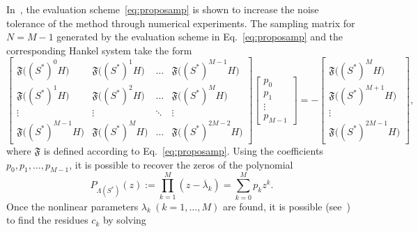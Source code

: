 \documentclass{arxiv}
\newcommand{\funF}{\mathfrak{F}}
\begin{document}
In~\cite{dozsa2025system}, the evaluation scheme~\eqref{eq:proposamp} is shown to increase the noise tolerance of the method through numerical experiments. 
The sampling matrix for $N = M-1$ generated by the evaluation scheme in Eq.~\eqref{eq:proposamp} and the corresponding Hankel system take the form
\begin{equation}\label{eq:hankRat}
    \begin{bmatrix}
         \funF\big(( S^{\ast})^{0} H\big) & \funF\big(( S^{\ast} )^1 H\big) & \ldots & \funF\big( ( S^{\ast} )^{M-1} H\big) \\
         \funF\big(( S^{\ast})^{1} H\big) & \funF\big(( S^{\ast})^{2} H\big) & \ldots & \funF\big(( S^{\ast})^{M} H\big) \\
         \vdots & \vdots & \ddots & \vdots \\
         \funF\big(( S^{\ast} )^{M-1} H\big) & \funF\big(( S^{\ast})^{M} H\big) & \ldots & \funF\big(( S^{\ast})^{2M-2} H\big)
    \end{bmatrix} \begin{bmatrix}
         p_0  \\
         p_1 \\
         \vdots \\
         p_{M-1}
    \end{bmatrix} = - \begin{bmatrix}
         \funF\big(( S^{\ast} )^{M} H\big) \\
         \funF\big(( S^{\ast} )^{M+1} H\big) \\
         \vdots \\
         \funF\big(( S^{\ast})^{2M-1} H\big)
    \end{bmatrix},
\end{equation}
where $\funF$ is defined according to Eq.~\eqref{eq:proposamp}. Using the coefficients $p_0, p_1, \ldots, p_{M-1}$, it is possible to recover the zeros of the polynomial
\begin{equation}
    \label{eq:ratPronPol}
    P_{\Lambda(S^{\ast})}(z) := \prod_{k=1}^{M} (z - \overline{\lambda}_k) = \sum_{k=0}^{M} p_k z^k.
\end{equation}
Once the nonlinear parameters $\lambda_k \ (k=1,\ldots,M)$ are found, it is possible (see~\cite{dozsa2025system}) to find the residues $c_k$ by solving
\end{document}
